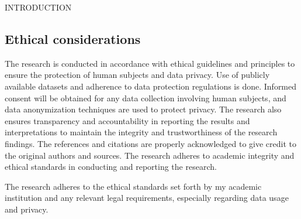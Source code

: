\begin{section}[]{\uppercase{Introduction}}
    \subsection{Ethical considerations}
    The research is conducted in accordance with ethical guidelines and principles to ensure the protection of human subjects and data privacy. Use of publicly available datasets and adherence to data protection regulations is done. Informed consent will be obtained for any data collection involving human subjects, and data anonymization techniques are used to protect privacy. The research also ensures transparency and accountability in reporting the results and interpretations to maintain the integrity and trustworthiness of the research findings. The references and citations are properly acknowledged to give credit to the original authors and sources. The research adheres to academic integrity and ethical standards in conducting and reporting the research.
    \par The research adheres to the ethical standards set forth by my academic institution and any relevant legal requirements, especially regarding data usage and privacy.



\end{section}

\pagebreak
